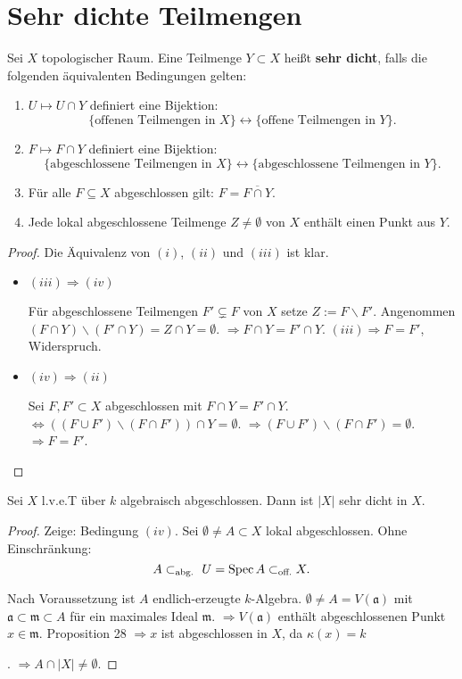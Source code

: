 \section{Sehr dichte Teilmengen}
\begin{defn}[29]
  Sei $X$ topologischer Raum. Eine Teilmenge $Y\subset X$ heißt \textbf{sehr
    dicht}, falls die folgenden äquivalenten Bedingungen gelten:
  \begin{enumerate}
  \item $U\mapsto U\cap Y$ definiert eine Bijektion:
    \[
      \{\text{offenen Teilmengen in }X\}\leftrightarrow\{\text{offene Teilmengen in }Y\}.
    \]
  \item $F\mapsto F\cap Y$ definiert eine Bijektion:
    \[
      \{\text{abgeschlossene Teilmengen in }X\}\leftrightarrow\{\text{abgeschlossene Teilmengen in }Y\}.
    \]
  \item Für alle $F\subseteq X$ abgeschlossen gilt: $F=\overline{F\cap Y}$.
  \item Jede lokal abgeschlossene Teilmenge $Z\neq\emptyset$ von $X$ enthält
    einen Punkt aus $Y$.
  \end{enumerate}
\end{defn}

\begin{proof}
  Die Äquivalenz von $(i)$, $(ii)$ und $(iii)$ ist klar.
  \begin{itemize}
  \item $(iii)\Rightarrow(iv)$
  
  Für abgeschlossene Teilmengen $F'\subsetneq F$ von $X$ setze $Z:=F\backslash F'$.
    Angenommen $(F\cap Y)\backslash(F'\cap Y)=Z\cap Y=\emptyset$. $\Longrightarrow F\cap Y=F'\cap Y$.
    $(iii)\Longrightarrow F=F'$, Widerspruch.
  \item $(iv)\Rightarrow(ii)$
  
  Sei $F,F'\subset X$ abgeschlossen mit $F\cap Y=F'\cap Y$. $\Longleftrightarrow((F\cup F')\backslash(F\cap F'))\cap Y=\emptyset$.
    $\Longrightarrow(F\cup F')\backslash(F\cap F')=\emptyset$. $\Longrightarrow F=F'$.
  \end{itemize}
\end{proof}
\begin{prop}[30]
  Sei $X$ l.v.e.T über $k$ algebraisch abgeschlossen. Dann ist $|X|$
  sehr dicht in $X$.
\end{prop}

\begin{proof}
  Zeige: Bedingung $(iv)$. Sei $\emptyset\neq A\subset X$ lokal abgeschlossen.
  Ohne Einschränkung: 
  \[
    A\subset_{\text{abg. }}U=\operatorname{Spec} A\subset_{\text{off.}}X.
  \]

  Nach Voraussetzung ist $A$ endlich-erzeugte $k$-Algebra. $\emptyset\neq A=V(\mathfrak{a})$
  mit $\mathfrak{a}\subset\mathfrak{m}\subset A$ für ein maximales
  Ideal $\mathfrak{m}$. $\Longrightarrow V(\mathfrak{a})$ enthält
  abgeschlossenen Punkt $x\in\mathfrak{m}$. Proposition 28 $\Longrightarrow x$
  ist abgeschlossen in $X$, da $\kappa(x)=k$%
  \begin{comment}
    unlesbar
  \end{comment}
  . $\Longrightarrow A\cap|X|\neq\emptyset$.
\end{proof}
